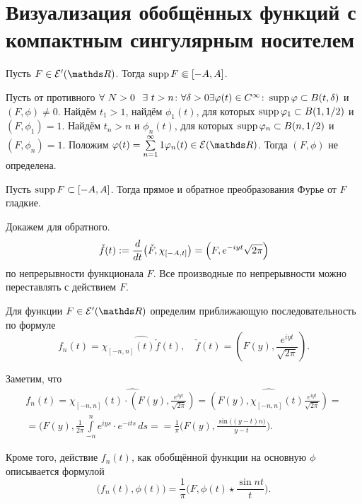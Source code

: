 \section{Визуализация обобщённых функций с компактным сингулярным носителем}

\begin{Ut}
Пусть $F\in \mathcal E'(\R)$. Тогда $\operatorname{supp} F \Subset [-A,A]$.
\end{Ut}
\begin{Proof}
  Пусть от противного $\forall\ N>0\hskip .75em plus.1em minus.08em\relax \exists\ t>n\colon \forall \delta>0 \exists \varphi(t)\in C^\infty\colon \operatorname{supp} \varphi\subset B(t,\delta)$ и $(F,\phi)\ne0$. Найдём $t_1>1$, найдём $\phi_1(t)$, для которых $\operatorname{supp}\varphi_1\subset B(1,1/2)$ и $(F,\phi_1)=1$. Найдём $t_n>n$ и $\phi_n(t)$, для которых $\operatorname{supp}\varphi_n\subset B(n,1/2)$ и $(F,\phi_n)=1$. Положим $\phi(t) = \rY n1 \phi_n(t)\in \mathcal E(\R)$. Тогда $(F,\phi)$ не определена.
\end{Proof}

\begin{Ut}
Пусть $\operatorname{supp} F\subset [-A,A]$. Тогда прямое и обратное преобразования Фурье от $F$ гладкие.
\end{Ut}
\begin{Proof}
  Докажем для обратного.
\[
  \check f (t):= \frac{d }{dt}\big( \check F,\chi_{[-A,t]}\big) = \left(F,e^{-iyt}{\sqrt{2\pi}}\right)
\]
по непрерывности функционала $F$. Все производные по непрерывности можно переставлять с действием $F$.
\end{Proof}

Для функции $F\in\mathcal E'(\R)$ определим приближающую последовательность по формуле
\[
  f_n(t) = \widehat{\chi_{[-n,n]}(t) \check f (t)},\quad \check f(t) = \left(F(y),\frac{e^{iyt}}{\sqrt{2\pi}}\right).
\]

Заметим, что
\begin{multline*}
f_n(t) = \widehat{\chi_{[-n,n]}(t) \cdot \left(F(y),\frac{e^{iyt}}{\sqrt{2\pi}}\right)} = 
  \widehat{\left(F(y),\chi_{[-n,n]}(t)\frac{e^{iyt}}{\sqrt{2\pi}}\right)} = \\
  = \bigg(F(y),\frac1{2\pi} \int\limits_{-n}^n e^{iys}\cdot e^{-its}\,ds = 
  = \frac1\pi\bigg( F(y), \frac{\sin\big((y-t)n\big)}{y-t}\bigg).
\end{multline*}

Кроме того, действие $f_n(t)$, как обобщённой функции на основную $\phi$ описывается формулой
\[
  \big(f_n(t),\phi(t)\big) = \frac1\pi \bigg(F, \phi(t)\star \frac{\sin nt}{t}\bigg).
\]
